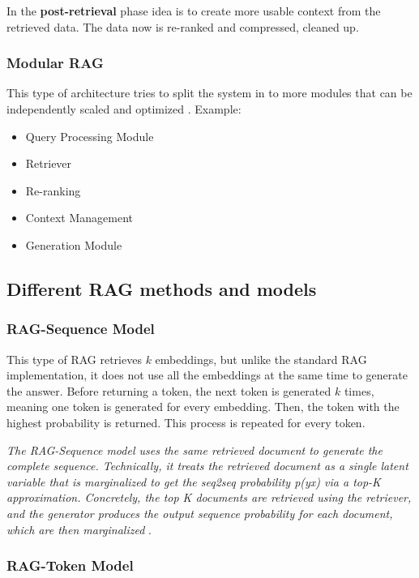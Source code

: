 \documentclass{wseas}
\begin{document}
In the \textbf{post-retrieval} phase idea is to create more usable context 
from the retrieved data. The data now is re-ranked and compressed, cleaned up.

\subsubsection{Modular RAG}

This type of architecture tries to split the system in to more modules
that can be independently scaled and optimized  \cite{Retrieval-Augmented_Generation_for_Large_Language_Models:_A_Survey}. 
Example:
\begin{itemize}
  \item Query Processing Module
  \item Retriever
  \item Re-ranking
  \item Context Management
  \item Generation Module
\end{itemize}


\subsection{Different RAG methods and
models}

\subsubsection{RAG-Sequence Model}

This type of RAG retrieves \(k\) embeddings, but unlike the standard RAG
implementation, it does not use all the embeddings at the same time to
generate the answer. Before returning a token, the next token is
generated \(k\) times, meaning one token is generated for every embedding.
Then, the token with the highest probability is returned. This 
process is repeated for every token.

\emph{The RAG-Sequence model uses the same retrieved document to
generate the complete sequence. Technically, it treats the retrieved
document as a single latent variable that is marginalized to get the
seq2seq probability p(y\textbar x) via a top-K approximation.
Concretely, the top K documents are retrieved using the retriever, and
the generator produces the output sequence probability for each
document, which are then marginalized} \cite{Retrieval_Augmented_Generation_(RAG)_Explained_Understanding_Key_Concepts}.

\subsubsection{RAG-Token Model}
\end{document}
